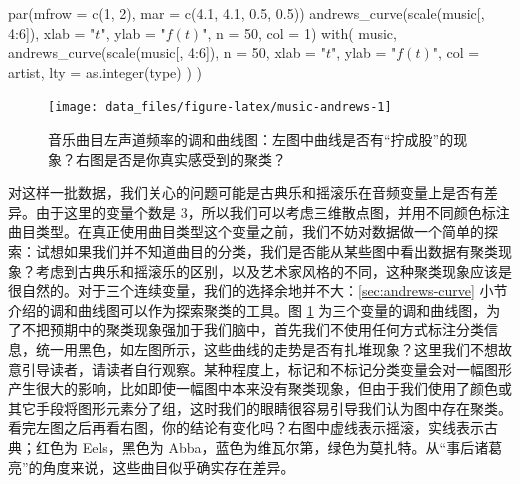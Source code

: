 \documentclass[
  b5paper,
  UTF8,twoside]{book}
\newenvironment{Shaded}{\begin{snugshade}}{\end{snugshade}}
\newcommand{\AttributeTok}[1]{\textcolor[rgb]{0.77,0.63,0.00}{#1}}
\newcommand{\DecValTok}[1]{\textcolor[rgb]{0.00,0.00,0.81}{#1}}
\newcommand{\FloatTok}[1]{\textcolor[rgb]{0.00,0.00,0.81}{#1}}
\newcommand{\FunctionTok}[1]{\textcolor[rgb]{0.00,0.00,0.00}{#1}}
\newcommand{\NormalTok}[1]{#1}
\newcommand{\SpecialCharTok}[1]{\textcolor[rgb]{0.00,0.00,0.00}{#1}}
\newcommand{\StringTok}[1]{\textcolor[rgb]{0.31,0.60,0.02}{#1}}
\begin{document}
\begin{Shaded}
\begin{Highlighting}[]
\FunctionTok{par}\NormalTok{(}\AttributeTok{mfrow =} \FunctionTok{c}\NormalTok{(}\DecValTok{1}\NormalTok{, }\DecValTok{2}\NormalTok{), }\AttributeTok{mar =} \FunctionTok{c}\NormalTok{(}\FloatTok{4.1}\NormalTok{, }\FloatTok{4.1}\NormalTok{, }\FloatTok{0.5}\NormalTok{, }\FloatTok{0.5}\NormalTok{))}
\FunctionTok{andrews\_curve}\NormalTok{(}\FunctionTok{scale}\NormalTok{(music[, }\DecValTok{4}\SpecialCharTok{:}\DecValTok{6}\NormalTok{]), }\AttributeTok{xlab =} \StringTok{"$t$"}\NormalTok{, }\AttributeTok{ylab =} \StringTok{"$f(t)$"}\NormalTok{,}
              \AttributeTok{n =} \DecValTok{50}\NormalTok{, }\AttributeTok{col =} \DecValTok{1}\NormalTok{)}
\FunctionTok{with}\NormalTok{(}
\NormalTok{  music,}
  \FunctionTok{andrews\_curve}\NormalTok{(}\FunctionTok{scale}\NormalTok{(music[, }\DecValTok{4}\SpecialCharTok{:}\DecValTok{6}\NormalTok{]),}
    \AttributeTok{n =} \DecValTok{50}\NormalTok{, }\AttributeTok{xlab =} \StringTok{"$t$"}\NormalTok{, }\AttributeTok{ylab =} \StringTok{"$f(t)$"}\NormalTok{,}
    \AttributeTok{col =}\NormalTok{ artist, }\AttributeTok{lty =} \FunctionTok{as.integer}\NormalTok{(type)}
\NormalTok{  )}
\NormalTok{)}
\end{Highlighting}
\end{Shaded}

\begin{figure}

{\centering \texttt{[image: data\_files/figure-latex/music-andrews-1]} 

}

\caption[音乐曲目左声道频率的调和曲线图]{音乐曲目左声道频率的调和曲线图：左图中曲线是否有``拧成股''的现象？右图是否是你真实感受到的聚类？}\label{fig:music-andrews}
\end{figure}



对这样一批数据，我们关心的问题可能是古典乐和摇滚乐在音频变量上是否有差异。由于这里的变量个数是 3，所以我们可以考虑三维散点图，并用不同颜色标注曲目类型。在真正使用曲目类型这个变量之前，我们不妨对数据做一个简单的探索：试想如果我们并不知道曲目的分类，我们是否能从某些图中看出数据有聚类现象？考虑到古典乐和摇滚乐的区别，以及艺术家风格的不同，这种聚类现象应该是很自然的。对于三个连续变量，我们的选择余地并不大：\ref{sec:andrews-curve} 小节介绍的调和曲线图可以作为探索聚类的工具。图 \ref{fig:music-andrews} 为三个变量的调和曲线图，为了不把预期中的聚类现象强加于我们脑中，首先我们不使用任何方式标注分类信息，统一用黑色，如左图所示，这些曲线的走势是否有扎堆现象？这里我们不想故意引导读者，请读者自行观察。某种程度上，标记和不标记分类变量会对一幅图形产生很大的影响，比如即使一幅图中本来没有聚类现象，但由于我们使用了颜色或其它手段将图形元素分了组，这时我们的眼睛很容易引导我们认为图中存在聚类。看完左图之后再看右图，你的结论有变化吗？右图中虚线表示摇滚，实线表示古典；红色为 Eels，黑色为 Abba，蓝色为维瓦尔第，绿色为莫扎特。从``事后诸葛亮''的角度来说，这些曲目似乎确实存在差异。
\end{document}
